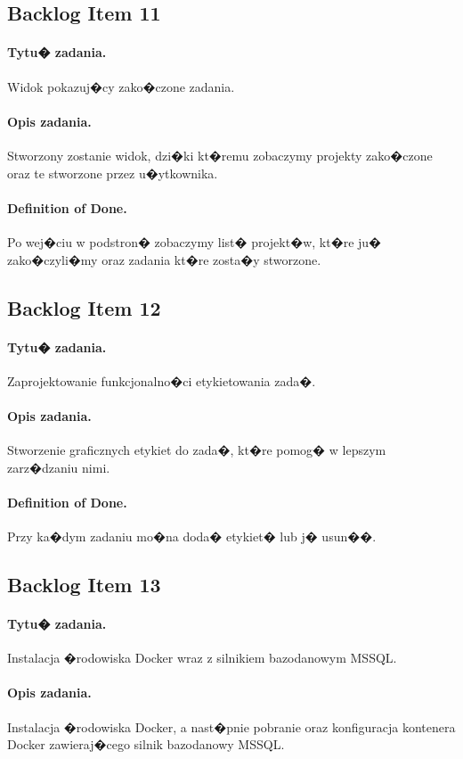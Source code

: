 ﻿\documentclass[a4paper]{article}
\begin{document}
\subsection{Backlog Item 11} 
\paragraph{Tytu� zadania.} Widok pokazuj�cy zako�czone zadania.
\paragraph{Opis zadania.} Stworzony zostanie widok, dzi�ki kt�remu zobaczymy projekty zako�czone oraz te stworzone przez u�ytkownika.
\paragraph{Definition of Done.} Po wej�ciu w podstron� zobaczymy list� projekt�w, kt�re ju� zako�czyli�my oraz zadania kt�re zosta�y stworzone.

\subsection{Backlog Item 12} 
\paragraph{Tytu� zadania.} Zaprojektowanie funkcjonalno�ci etykietowania zada�.
\paragraph{Opis zadania.} Stworzenie graficznych etykiet do zada�, kt�re pomog� w lepszym zarz�dzaniu nimi.
\paragraph{Definition of Done.} Przy ka�dym zadaniu mo�na doda� etykiet� lub j� usun��.



\subsection{Backlog Item 13} 
\paragraph{Tytu� zadania.}  Instalacja �rodowiska Docker wraz z silnikiem bazodanowym MSSQL.
\paragraph{Opis zadania.} Instalacja �rodowiska Docker, a nast�pnie pobranie oraz konfiguracja kontenera Docker zawieraj�cego silnik bazodanowy MSSQL.
\end{document}
